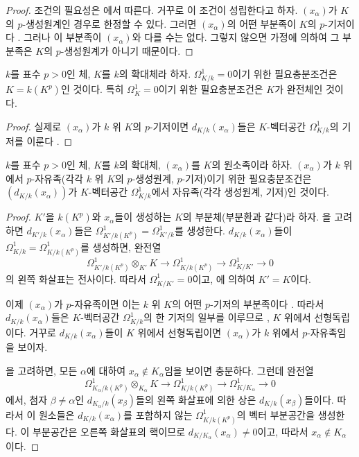 \begin{proof}
조건의 필요성은 에서 따른다. 거꾸로 이 조건이
성립한다고 하자. $(x_\alpha)$가 $K$의 $p$-생성원계인 경우로
한정할 수 있다. 그러면 $(x_\alpha)$의 어떤 부분족이 $K$의
$p$-기저이다 . 그러나 이 부분족이
$(x_\alpha)$와 다를 수는 없다. 그렇지 않으면 가정에 의하여 그
부분족은 $K$의 $p$-생성원계가 아니기 때문이다.
\end{proof}

\begin{corollary}[21.4.4]
\label{0.21.4.4-ko}
$k$를 표수 $p>0$인 체, $K$를 $k$의 확대체라 하자.
$\Omega^1_{K/k}=0$이기 위한 필요충분조건은 $K=k(K^p)$인 것이다.
특히 $\Omega^1_K=0$이기 위한 필요충분조건은 $K$가 완전체인 것이다.
\end{corollary}

\begin{proof}
실제로 $(x_\alpha)$가 $k$ 위 $K$의 $p$-기저이면
$d_{K/k}(x_\alpha)$들은 $K$-벡터공간 $\Omega^1_{K/k}$의 기저를
이룬다 .
\end{proof}

\begin{theorem}[21.4.5]
\label{0.21.4.5-ko}
$k$를 표수 $p>0$인 체, $K$를 $k$의 확대체,
$(x_\alpha)$를 $K$의 원소족이라 하자. $(x_\alpha)$가 $k$ 위에서
$p$-자유족(각각 $k$ 위 $K$의 $p$-생성원계, $p$-기저)이기 위한
필요충분조건은 $(d_{K/k}(x_\alpha))$가 $K$-벡터공간
$\Omega^1_{K/k}$에서 자유족(각각 생성원계, 기저)인 것이다.
\end{theorem}

\begin{proof}
$K'$을 $k(K^p)$와 $x_\alpha$들이 생성하는 $K$의 부분체(부분환과
같다)라 하자. 을 고려하면
$d_{K'/k}(x_\alpha)$들은
$\Omega^1_{K'/k(K^p)}=\Omega^1_{K'/k}$를 생성한다.
$d_{K/k}(x_\alpha)$들이
$\Omega^1_{K/k}=\Omega^1_{K/k(K^p)}$를 생성하면, 완전열
\[
\Omega^1_{K'/k(K^p)}\otimes_{K'}K\longrightarrow
\Omega^1_{K/k(K^p)}\longrightarrow\Omega^1_{K/K'}\longrightarrow0
\]
의 왼쪽 화살표는 전사이다. 따라서 $\Omega^1_{K/K'}=0$이고,
에 의하여 $K'=K$이다.

이제 $(x_\alpha)$가 $p$-자유족이면 이는 $k$ 위 $K$의 어떤
$p$-기저의 부분족이다 . 따라서
$d_{K/k}(x_\alpha)$들은 $K$-벡터공간 $\Omega^1_{K/k}$의 한 기저의
일부를 이루므로 , $K$ 위에서 선형독립이다.
거꾸로 $d_{K/k}(x_\alpha)$들이 $K$ 위에서 선형독립이면
$(x_\alpha)$가 $k$ 위에서 $p$-자유족임을 보이자.

을 고려하면, 모든 $\alpha$에 대하여
$x_\alpha\notin K_\alpha$임을 보이면 충분하다. 그런데 완전열
\[
\Omega^1_{K_\alpha/k(K^p)}\otimes_{K_\alpha}K\longrightarrow
\Omega^1_{K/k(K^p)}\longrightarrow\Omega^1_{K/K_\alpha}\longrightarrow0
\]
에서, 첨자 $\beta\neq\alpha$인 $d_{K_\alpha/k}(x_\beta)$들의 왼쪽
화살표에 의한 상은 $d_{K/k}(x_\beta)$들이다. 따라서 이 원소들은
$d_{K/k}(x_\alpha)$를 포함하지 않는 $\Omega^1_{K/k(K^p)}$의
벡터 부분공간을 생성한다. 이 부분공간은 오른쪽 화살표의 핵이므로
$d_{K/K_\alpha}(x_\alpha)\neq0$이고, 따라서
$x_\alpha\notin K_\alpha$이다.
\end{proof}

